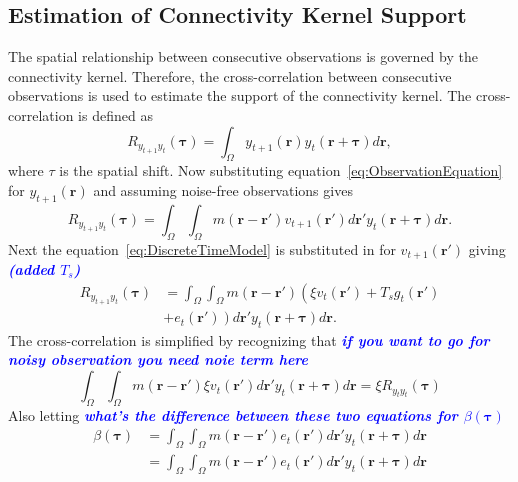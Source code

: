 \documentclass[conference]{IEEEtran}
\newcommand{\parham}[1]{\textsf{\emph{\textbf{\textcolor{blue}{#1}}}}}
\begin{document}
\subsection{Estimation of Connectivity Kernel Support}
The spatial relationship between consecutive observations is governed by the connectivity kernel. Therefore, the cross-correlation between consecutive observations is used to estimate the support of the connectivity kernel. The cross-correlation is defined as
\begin{equation}
	R_{y_{t+1}y_t}(\boldsymbol{\tau}) = \int_{\Omega} y_{t+1}(\mathbf{r}) y_t(\mathbf{r}+\boldsymbol{\tau}) d\mathbf{r},
\end{equation}
where $\tau$ is the spatial shift. Now substituting equation~\ref{eq:ObservationEquation} for $y_{t+1}(\mathbf{r})$ and assuming noise-free observations gives 
\begin{equation}
	R_{y_{t+1}y_t}(\boldsymbol{\tau}) = \int_{\Omega}\int_{\Omega} m(\mathbf{r}-\mathbf{r}')v_{t+1}(\mathbf{r}')d\mathbf{r}' y_t(\mathbf{r}+\boldsymbol{\tau}) d\mathbf{r}.
\end{equation}
Next the equation~\ref{eq:DiscreteTimeModel} is substituted in for $v_{t+1}(\mathbf{r}')$ giving \parham{(added $T_s$)}
\begin{align}
	R_{y_{t+1}y_t}(\boldsymbol{\tau}) &= \int_{\Omega}\int_{\Omega} m(\mathbf{r}-\mathbf{r}')\left(\xi v_t(\mathbf{r}') +  T_s g_t(\mathbf{r}')\right. \nonumber \\
	&+ \left. e_t(\mathbf{r}')\right) d\mathbf{r}' y_t(\mathbf{r}+\boldsymbol{\tau}) d\mathbf{r}. 
\end{align}
The cross-correlation is simplified by recognizing that \parham{if you want to go for noisy observation you need noie term here}
\begin{equation}
	\int_{\Omega}\int_{\Omega} m(\mathbf{r}-\mathbf{r}')\xi v_t(\mathbf{r}')d\mathbf{r}'y_t(\mathbf{r}+\boldsymbol{\tau}) d\mathbf{r} = \xi R_{y_ty_t}(\boldsymbol{\tau})
\end{equation}
Also letting \parham{what's the difference between these two equations for $\beta(\boldsymbol{\tau})$}
\begin{align}
	\beta(\boldsymbol{\tau}) &= \int_{\Omega}\int_{\Omega} m(\mathbf{r}-\mathbf{r}') e_t(\mathbf{r}') d\mathbf{r}'y_t(\mathbf{r}+\boldsymbol{\tau}) d\mathbf{r} \\
	&= \int_{\Omega}\int_{\Omega} m(\mathbf{r}-\mathbf{r}') e_t(\mathbf{r}') d\mathbf{r}' y_t(\mathbf{r}+\boldsymbol{\tau}) d\mathbf{r}	
\end{align}
\end{document}
